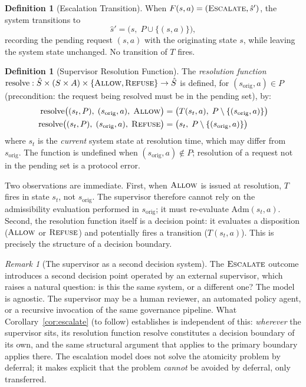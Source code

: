 \documentclass[11pt]{article}
\theoremstyle{plain}
\theoremstyle{definition}
\newtheorem{definition}[theorem]{Definition}
\theoremstyle{remark}
\newtheorem{remark}[theorem]{Remark}
\newcommand{\Allow}{\textsc{Allow}}
\newcommand{\Refuse}{\textsc{Refuse}}
\newcommand{\Escalate}{\textsc{Escalate}}
\newcommand{\Adm}{\mathrm{Adm}}
\begin{document}
\begin{definition}[Escalation Transition]
\label{def:esctrans}
When $F(s, a) = (\Escalate, \hat{s}')$, the system transitions to
\[
  \hat{s}' = \bigl(s,\; P \cup \{(s, a)\}\bigr),
\]
recording the pending request $(s, a)$ with the originating state $s$, while
leaving the system state unchanged.  No transition of $T$ fires.
\end{definition}

\begin{definition}[Supervisor Resolution Function]
\label{def:resolve}
The \emph{resolution function} $\mathrm{resolve} : \hat{S} \times (S \times A)
\times \{{\Allow, \Refuse}\} \to \hat{S}$ is defined, for
$(s_{\mathrm{orig}}, a) \in P$ (precondition: the request being resolved must
be in the pending set), by:
\begin{align}
  \mathrm{resolve}\bigl((s_t, P),\; (s_{\mathrm{orig}}, a),\; \Allow\bigr)
    &= \bigl(T(s_t, a),\; P \setminus \{(s_{\mathrm{orig}}, a)\}\bigr)
    \label{eq:res-allow}\\
  \mathrm{resolve}\bigl((s_t, P),\; (s_{\mathrm{orig}}, a),\; \Refuse\bigr)
    &= \bigl(s_t,\; P \setminus \{(s_{\mathrm{orig}}, a)\}\bigr)
    \label{eq:res-refuse}
\end{align}
where $s_t$ is the \emph{current} system state at resolution time, which may
differ from $s_{\mathrm{orig}}$.  The function is undefined when
$(s_{\mathrm{orig}}, a) \notin P$; resolution of a request not in the pending
set is a protocol error.
\end{definition}

Two observations are immediate.  First, when $\Allow$ is issued at resolution,
$T$ fires in state $s_t$, not $s_{\mathrm{orig}}$.  The supervisor therefore
cannot rely on the admissibility evaluation performed in $s_{\mathrm{orig}}$;
it must re-evaluate $\Adm(s_t, a)$.  Second, the resolution function
itself is a decision point: it evaluates a disposition ($\Allow$ or $\Refuse$)
and potentially fires a transition ($T(s_t, a)$).  This is precisely the
structure of a decision boundary.

\begin{remark}[The supervisor as a second decision system]
\label{rem:supervisor}
The $\Escalate$ outcome introduces a second decision point operated by an
external supervisor, which raises a natural question: is this the same system,
or a different one?  The model is agnostic.  The supervisor may be a human
reviewer, an automated policy agent, or a recursive invocation of the same
governance pipeline.  What Corollary~\ref{cor:escalate} (to follow) establishes
is independent of this: \emph{wherever} the supervisor sits, its resolution
function $\mathrm{resolve}$ constitutes a decision boundary of its own, and
the same structural argument that applies to the primary boundary applies
there.  The escalation model does not solve the atomicity problem by deferral;
it makes explicit that the problem \emph{cannot} be avoided by deferral, only
transferred.
\end{remark}
\end{document}
